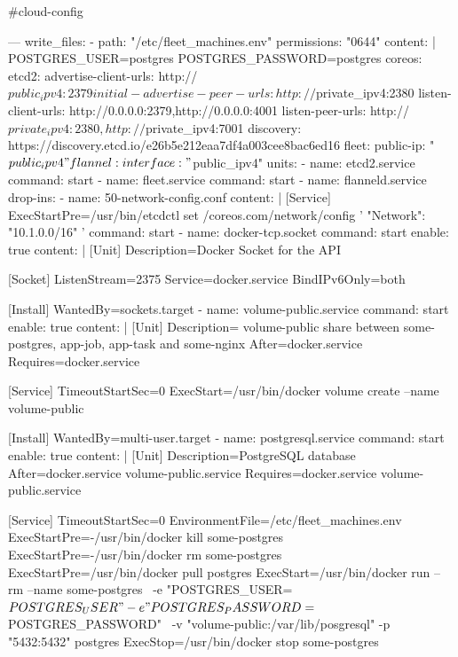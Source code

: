 \begin{codelisting}
\label{code:vagrantfile2}
\begin{code}
#cloud-config

---
write_files:
  - path: "/etc/fleet_machines.env"
    permissions: "0644"
    content: |
      POSTGRES_USER=postgres
      POSTGRES_PASSWORD=postgres
coreos:
  etcd2:
    advertise-client-urls: http://$public_ipv4:2379
    initial-advertise-peer-urls: http://$private_ipv4:2380
    listen-client-urls: http://0.0.0.0:2379,http://0.0.0.0:4001
    listen-peer-urls: http://$private_ipv4:2380,http://$private_ipv4:7001
    discovery: https://discovery.etcd.io/e26b5e212eaa7df4a003cee8bac6ed16
  fleet:
    public-ip: "$public_ipv4"
  flannel:
    interface: "$public_ipv4"
  units:
  - name: etcd2.service
    command: start
  - name: fleet.service
    command: start
  - name: flanneld.service
    drop-ins:
    - name: 50-network-config.conf
      content: |
        [Service]
        ExecStartPre=/usr/bin/etcdctl set /coreos.com/network/config '{ "Network": "10.1.0.0/16" }'
    command: start
  - name: docker-tcp.socket
    command: start
    enable: true
    content: |
      [Unit]
      Description=Docker Socket for the API

      [Socket]
      ListenStream=2375
      Service=docker.service
      BindIPv6Only=both

      [Install]
      WantedBy=sockets.target
  - name: volume-public.service
    command: start
    enable: true
    content: |
      [Unit] 
      Description= volume-public share between some-postgres, app-job, app-task and some-nginx 
      After=docker.service
      Requires=docker.service

      [Service] 
      TimeoutStartSec=0 
      ExecStart=/usr/bin/docker volume create --name volume-public

      [Install] 
      WantedBy=multi-user.target
  - name: postgresql.service
    command: start
    enable: true
    content: |
      [Unit] 
      Description=PostgreSQL database 
      After=docker.service volume-public.service
      Requires=docker.service volume-public.service

      [Service] 
      TimeoutStartSec=0
      EnvironmentFile=/etc/fleet_machines.env
      ExecStartPre=-/usr/bin/docker kill some-postgres 
      ExecStartPre=-/usr/bin/docker rm some-postgres 
      ExecStartPre=/usr/bin/docker pull postgres 
      ExecStart=/usr/bin/docker run --rm --name some-postgres \
      -e "POSTGRES_USER=${POSTGRES_USER}" -e "POSTGRES_PASSWORD=${POSTGRES_PASSWORD}" \
      -v "volume-public:/var/lib/posgresql" -p "5432:5432" postgres 
      ExecStop=/usr/bin/docker stop some-postgres


\end{code}
\end{codelisting}
